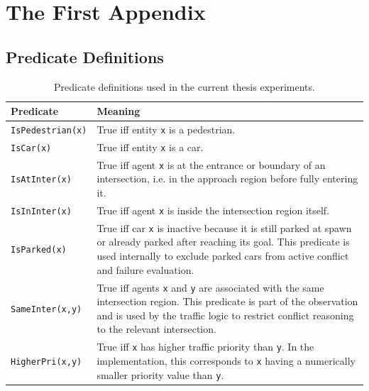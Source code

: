 \chapter{The First Appendix}
\label{app:A}

\section{Predicate Definitions}
\label{app:predicate-definitions}

\begin{table}[H]
\centering
\small
\caption{Predicate definitions used in the current thesis experiments.}
\label{tab:predicate-definitions}
\begin{tabularx}{\linewidth}{@{}p{3.8cm} X@{}}
\toprule
\textbf{Predicate} & \textbf{Meaning} \\
\midrule

\texttt{IsPedestrian(x)}
& True iff entity \texttt{x} is a pedestrian. \\

\texttt{IsCar(x)}
& True iff entity \texttt{x} is a car. \\

\texttt{IsAtInter(x)}
& True iff agent \texttt{x} is at the entrance or boundary of an intersection, i.e. in the approach region before fully entering it. \\

\texttt{IsInInter(x)}
& True iff agent \texttt{x} is inside the intersection region itself. \\

\texttt{IsParked(x)}
& True iff car \texttt{x} is inactive because it is still parked at spawn or already parked after reaching its goal. This predicate is used internally to exclude parked cars from active conflict and failure evaluation. \\

\texttt{SameInter(x,y)}
& True iff agents \texttt{x} and \texttt{y} are associated with the same intersection region. This predicate is part of the observation and is used by the traffic logic to restrict conflict reasoning to the relevant intersection. \\

\texttt{HigherPri(x,y)}
& True iff \texttt{x} has higher traffic priority than \texttt{y}. In the implementation, this corresponds to \texttt{x} having a numerically smaller priority value than \texttt{y}. \\


\end{tabularx}
\end{table}
